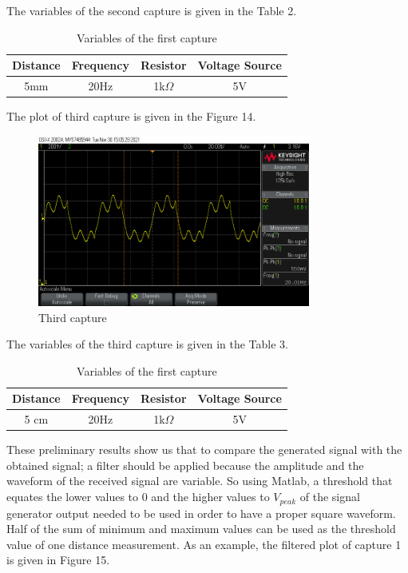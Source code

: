 \documentclass[letterpaper,12pt]{article}
\begin{document}
The variables of the second capture is given in the Table 2.
\begin{table}[H]
	\begin{center}
		\caption{Variables of the first capture}
		\vspace{2mm}
		\begin{tabular}{||c | c | c | c||} 
		 \hline
		 Distance & Frequency & Resistor & Voltage Source\\ [0.5ex] 
		 \hline\hline
		  5mm & 20Hz &  1k\( \Omega \) & 5V  \\ 
		 \hline
		\end{tabular}
	\end{center}
	\end{table}
The plot of third capture is given in the Figure 14.
\begin{figure}[H]
	\centering
   \includegraphics[width=0.8\textwidth]{capture3_ss 0.png}
   \caption{Third capture}
\end{figure} 
The variables of the third capture is given in the Table 3.
\begin{table}[H]
	\begin{center}
		\caption{Variables of the first capture}
		\vspace{2mm}
		\begin{tabular}{||c | c | c | c||} 
		 \hline
		 Distance & Frequency & Resistor & Voltage Source\\ [0.5ex] 
		 \hline\hline
		  5 cm & 20Hz &  1k\( \Omega \) & 5V  \\ 
		 \hline
		\end{tabular}
	\end{center}
	\end{table}
These preliminary results show us that to compare the generated signal with the obtained signal; a filter should be applied because the amplitude and the waveform of the received signal are variable. So using Matlab, a threshold that equates the lower values to 0 and the higher values to \(V_{peak}\) of the signal generator output needed to be used in order to have a proper square waveform. Half of the sum of minimum and maximum values can be used as the threshold value of one distance measurement. As an example, the filtered plot of capture 1 is given in Figure 15.
\end{document}
